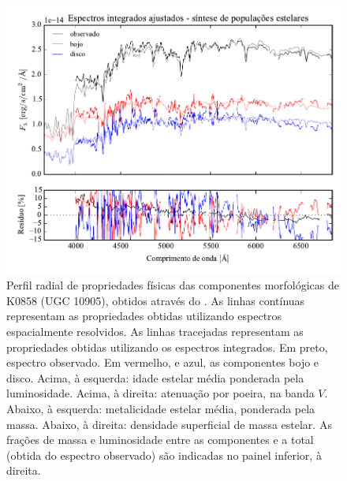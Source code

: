 \begin{figure}
	\includegraphics[page=16]{figuras/sample006a_synthesis}
	\caption[Propriedades físicas das componentes morfológicas de K0858 (UGC 10905)]
	{Perfil radial de propriedades físicas das componentes morfológicas de
	K0858 (UGC 10905), obtidos através do \starlight. As linhas contínuas
	representam as propriedades obtidas utilizando espectros espacialmente
	resolvidos. As linhas tracejadas representam as propriedades obtidas utilizando
	os espectros integrados. Em preto, espectro observado. Em vermelho, e azul, as
	componentes bojo e disco. Acima, à esquerda: idade estelar média ponderada pela
	luminosidade. Acima, à direita: atenuação por poeira, na banda $V$. Abaixo, à
	esquerda: metalicidade estelar média, ponderada pela massa. Abaixo, à direita:
	densidade superficial de massa estelar. As frações de massa e luminosidade
	entre as componentes e a total (obtida do espectro observado) são indicadas no
	painel inferior, à direita.}
	\label{fig:decompSinteseRadprof}
\end{figure}


